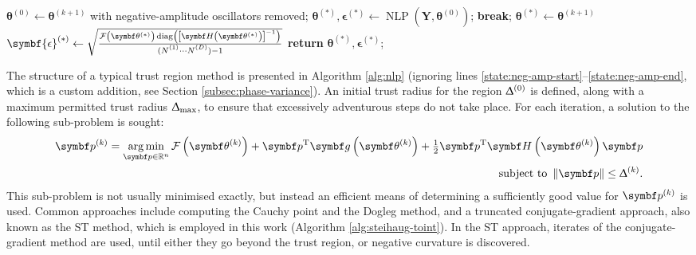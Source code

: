 \begin{algorithm}
\begin{algorithmic}[1]
                    \State $\symbf{\theta}^{(0)} \gets \symbf{\theta}^{(k+1)}$ with negative-amplitude oscillators removed;
                    \State $\symbf{\theta}^{(*)}, \symbf{\epsilon}^{(*)} \gets \operatorname{NLP}\left(\symbf{Y}, \symbf{\theta}^{(0)}\right)$;
                \EndIf\label{state:neg-amp-end}
                    \State \textbf{break};
                \EndIf
            \EndFor
            \State $\symbf{\theta}^{(*)} \gets \symbf{\theta}^{(k+1)}$
            \State $\symbf{\epsilon}^{(*)} \gets
                \sqrt{
                    \frac
                    {
                        \Fthstar \diag \left(
                            \left[\bdHthstar\right]^{-1}
                        \right)
                    }
                    {(\None \cdots \ND) - 1}
                }$
            \State \textbf{return} $\symbf{\theta}^{(*)}, \symbf{\epsilon}^{(*)}$;
        \EndProcedure
    \end{algorithmic}
\end{algorithm}

The structure of a typical trust region method is presented in Algorithm
\ref{alg:nlp} (ignoring lines
\ref{state:neg-amp-start}--\ref{state:neg-amp-end}, which is a custom addition,
see Section \ref{subsec:phase-variance}). An initial trust radius for the region
$\Updelta^{(0)}$ is defined, along with a maximum permitted trust radius
$\Updelta_{\text{max}}$, to ensure that excessively adventurous steps do not take place.
For each iteration, a solution to the following sub-problem is sought:
\begin{equation}
    \begin{split}
        \bpk = \argmin_{\bp \in \mathbb{R}^{n}}
            \Fthk +
            \bp\T \bdgthk +
            \tfrac{1}{2} \bp\T \bdHthk \bp \\
        \text{subject to } \left \lVert \bp \right \rVert \leq \trustradius{k}.
    \end{split}
\end{equation}
This sub-problem is not usually minimised exactly, but instead an efficient
means of determining a sufficiently good value for $\bpk$ is used.
Common approaches include computing the Cauchy point and the Dogleg
method, and a truncated conjugate-gradient
approach, also known as the \ac{ST} method\cite[Chapter 7]{Nocedal2006},
which is employed in this work (Algorithm \ref{alg:steihaug-toint}). In the
\ac{ST} approach, iterates of the conjugate-gradient method are used, until
either they go beyond the trust region, or negative curvature is discovered.

